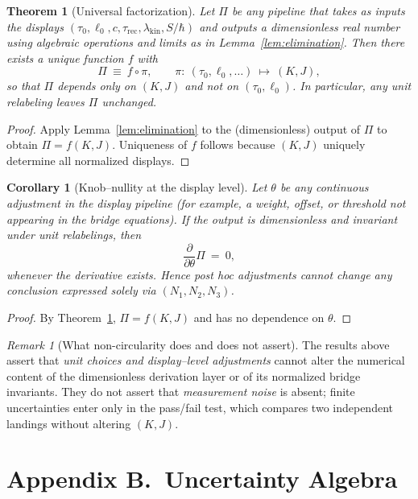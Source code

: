 \documentclass[11pt]{article}
\theoremstyle{plain}
\newtheorem{theorem}{Theorem}
\newtheorem{corollary}{Corollary}
\theoremstyle{definition}
\theoremstyle{remark}
\newtheorem*{remark}{Remark}
\begin{document}
\begin{theorem}[Universal factorization]\label{thm:factorization}
Let \(\Pi\) be any pipeline that takes as inputs the displays \((\tau_{0},\ell_{0},c,\tau_{\mathrm{rec}},\lambda_{\mathrm{kin}},S/\hbar)\) and outputs a dimensionless real number using algebraic operations and limits as in Lemma~\ref{lem:elimination}. Then there exists a unique function \(f\) with
\[
\Pi\ \equiv\ f\circ \pi,\qquad \pi:\ (\tau_{0},\ell_{0},\ldots)\ \mapsto\ (K,J),
\]
so that \(\Pi\) depends only on \((K,J)\) and not on \((\tau_{0},\ell_{0})\). In particular, any unit relabeling leaves \(\Pi\) unchanged.
\end{theorem}

\begin{proof}
Apply Lemma~\ref{lem:elimination} to the (dimensionless) output of \(\Pi\) to obtain \(\Pi=f(K,J)\). Uniqueness of \(f\) follows because \((K,J)\) uniquely determine all normalized displays.
\end{proof}

\begin{corollary}[Knob–nullity at the display level]
Let \(\theta\) be any continuous adjustment in the display pipeline (for example, a weight, offset, or threshold not appearing in the bridge equations). If the output is dimensionless and invariant under unit relabelings, then
\[
\frac{\partial}{\partial\theta}\Pi\ =\ 0,
\]
whenever the derivative exists. Hence post hoc adjustments cannot change any conclusion expressed solely via \((N_{1},N_{2},N_{3})\).
\end{corollary}

\begin{proof}
By Theorem~\ref{thm:factorization}, \(\Pi=f(K,J)\) and has no dependence on \(\theta\).
\end{proof}

\begin{remark}[What non-circularity does and does not assert]
The results above assert that \emph{unit choices and display–level adjustments} cannot alter the numerical content of the dimensionless derivation layer or of its normalized bridge invariants. They do not assert that \emph{measurement noise} is absent; finite uncertainties enter only in the pass/fail test, which compares two independent landings without altering \((K,J)\).
\end{remark}

\section*{Appendix B.\ Uncertainty Algebra}
\end{document}
